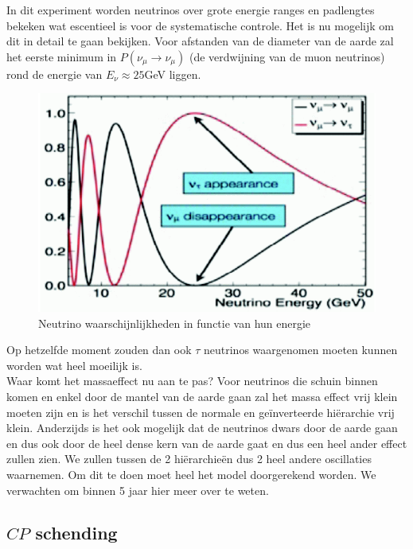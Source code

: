 \documentclass[../main.tex]{subfiles}
\begin{document}
In dit experiment worden neutrinos over grote energie ranges en padlengtes bekeken wat escentieel is voor de systematische controle. Het is nu mogelijk om dit in detail te gaan bekijken. Voor afstanden van de diameter van de aarde zal het eerste minimum in $P\left(\nu_{\mu} \rightarrow \nu_{\mu}\right)$ (de verdwijning van de muon neutrinos) rond de energie van $E_\nu \approx 25$GeV liggen.

\begin{figure}[h]
    \centering
    \includegraphics[width=0.5\linewidth]{neutrinos/muon_tau_neutr_osc.png}
    \caption{Neutrino waarschijnlijkheden in functie van hun energie}%
    \label{fig:neutrino}
\end{figure}

Op hetzelfde moment zouden dan ook $\tau$ neutrinos waargenomen moeten kunnen worden wat heel moeilijk is.\\
Waar komt het massaeffect nu aan te pas? Voor neutrinos die schuin binnen komen en enkel door de mantel van de aarde gaan zal het massa effect vrij klein moeten zijn en is het verschil tussen de normale en geïnverteerde hiërarchie vrij klein. Anderzijds is het ook mogelijk dat de neutrinos dwars door de aarde gaan en dus ook door de heel dense kern van de aarde gaat en dus een heel ander effect zullen zien. We zullen tussen de 2 hiërarchieën dus 2 heel andere oscillaties waarnemen. Om dit te doen moet heel het model doorgerekend worden. We verwachten om binnen 5 jaar hier meer over te weten.

\subsection{$CP$ schending}%
\label{sub:_cp_schending_neutrinos}
\end{document}
